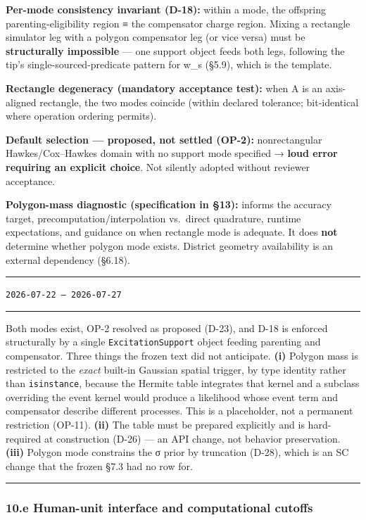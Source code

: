 \documentclass[
  10pt,
]{article}
\newenvironment{amendment}[2]{%
  \par\medskip\noindent
  {\color{amdcolor}\rule{\linewidth}{1pt}}\par\nobreak
  \vspace{-0.45\baselineskip}
  \noindent{\color{amdcolor}\textbf{#1}}\hfill{\color{amdcolor}\small\texttt{#2}}\par\nobreak
  \vspace{-0.35\baselineskip}
  {\color{amdcolor}\rule{\linewidth}{0.4pt}}\par\nobreak\smallskip
}{%
  \par\nobreak\vspace{-0.25\baselineskip}
  {\color{amdcolor}\rule{\linewidth}{1pt}}\par\medskip
}
\begin{document}
\textbf{Per-mode consistency invariant (D-18):} within a mode, the offspring parenting-eligibility region ≡ the compensator charge region. Mixing a rectangle simulator leg with a polygon compensator leg (or vice versa) must be \textbf{structurally impossible} --- one support object feeds both legs, following the tip's single-sourced-predicate pattern for w\_s (§5.9), which is the template.

\textbf{Rectangle degeneracy (mandatory acceptance test):} when A is an axis-aligned rectangle, the two modes coincide (within declared tolerance; bit-identical where operation ordering permits).

\textbf{Default selection --- proposed, not settled (OP-2):} nonrectangular Hawkes/Cox--Hawkes domain with no support mode specified → \textbf{loud error requiring an explicit choice}. Not silently adopted without reviewer acceptance.

\textbf{Polygon-mass diagnostic (specification in §13):} informs the accuracy target, precomputation/interpolation vs.~direct quadrature, runtime expectations, and guidance on when rectangle mode is adequate. It does \textbf{not} determine whether polygon mode exists. District geometry availability is an external dependency (§6.18).

\begin{amendment}{A-10 --- 10.d as implemented}{2026-07-22 -- 2026-07-27}
Both modes exist, OP-2 resolved as proposed (D-23), and D-18 is enforced structurally by a single \texttt{ExcitationSupport} object feeding parenting and compensator. Three things the frozen text did not anticipate. \textbf{(i)} Polygon mass is restricted to the \emph{exact} built-in Gaussian spatial trigger, by type identity rather than \texttt{isinstance}, because the Hermite table integrates that kernel and a subclass overriding the event kernel would produce a likelihood whose event term and compensator describe different processes. This is a placeholder, not a permanent restriction (OP-11). \textbf{(ii)} The table must be prepared explicitly and is hard-required at construction (D-26) --- an API change, not behavior preservation. \textbf{(iii)} Polygon mode constrains the σ prior by truncation (D-28), which is an SC change that the frozen §7.3 had no row for.
\end{amendment}

\hypertarget{e-human-unit-interface-and-computational-cutoffs}{%
\subsubsection{10.e Human-unit interface and computational cutoffs}\label{e-human-unit-interface-and-computational-cutoffs}}
\end{document}
